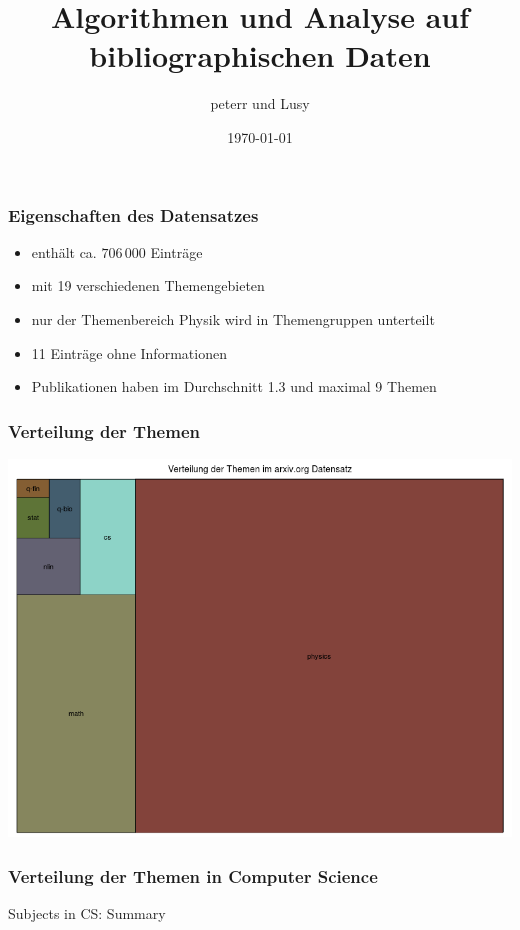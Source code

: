 \documentclass[12pt, xcolor=table]{beamer}
\begin{document}
\title{Algorithmen und Analyse auf bibliographischen Daten}
\author{peterr und Lusy}
\date{\today}

\begin{frame}
	\titlepage
\end{frame}

\begin{frame}
	\frametitle{Eigenschaften des Datensatzes}
	\begin{itemize}
		\item  enthält ca. $706\,000$ Einträge
		\item  mit 19 verschiedenen Themengebieten
		\item  nur der Themenbereich Physik wird in Themengruppen unterteilt
		\item  11 Einträge ohne Informationen
		\item  Publikationen haben im Durchschnitt 1.3 und maximal 9 Themen
	\end{itemize}
\end{frame}

\begin{frame}
	\frametitle{Verteilung der Themen}
	\begin{center}
		\includegraphics[scale=0.35]{../../visual/treeParent2.png}
	\end{center}
\end{frame}

\begin{frame}[fragile]
    \frametitle{Verteilung der Themen in Computer Science}
    \begin{block}{Subjects in CS: Summary}
    	
	\end{block}
\end{frame}
\end{document}
